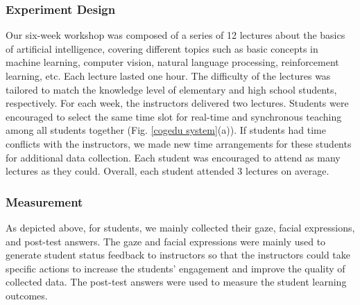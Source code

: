 \subsubsection{\textbf{Experiment Design}}
Our six-week workshop was composed of a series of 12 lectures about the basics of artificial intelligence, covering different topics such as basic concepts in machine learning, computer vision, natural language processing, reinforcement learning, etc. Each lecture lasted one hour. The difficulty of the lectures was tailored to match the knowledge level of elementary and high school students, respectively.
%
For each week, the instructors delivered two lectures. Students were encouraged to select the same time slot for real-time and synchronous teaching among all students together (Fig. \ref{cogedu system}(a)). If students had time conflicts with the instructors, we made new time arrangements for these students for additional data collection.
%
Each student was encouraged to attend as many lectures as they could. Overall, each student attended 3 lectures on average. 



\subsubsection{\textbf{Measurement}}
As depicted above, for students, we mainly collected their gaze, facial expressions, and post-test answers. The gaze and facial expressions were mainly used to generate student status feedback to instructors so that the instructors could take specific actions to increase the students' engagement and improve the quality of collected data. The post-test answers were used to measure the student learning outcomes.



